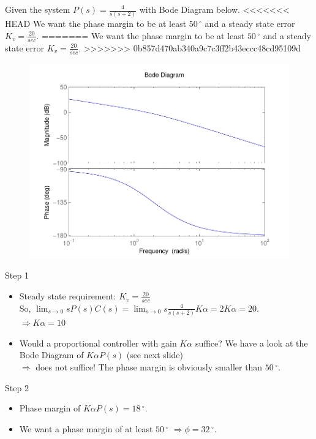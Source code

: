 \begin{frame}
\begin{example}
	Given the system $P(s) = \frac{4}{s(s+2)}$ with Bode Diagram below. 
	\vspace{0.1 cm}
<<<<<<< HEAD
	We want the phase margin to be at least $50\,^{\circ}$ and a steady state error $K_v = \frac{20}{sec}$.  
=======
	We want the phase margin to be at least $50\,^{\circ}$ and a steady state error $K_v = \frac{20}{sec}$.
>>>>>>> 0b857d470ab340a9c7c3ff2b43eccc48cd95109d
	\begin{figure}
		\centering
		\includegraphics[width=0.5
		\linewidth]{bodeexamplelead}
	\end{figure}
\end{example}
\end{frame}

\begin{frame}
\begin{exampleblock}{Step 1}
\begin{itemize}	
\item Steady state requirement: $K_v = \frac{20}{sec}$ \\
So, $\lim_{s \to 0} sP(s)C(s) = \lim_{s \to 0} s\frac{4}{s(s+2)}K\alpha = 2K\alpha = 20$. \\
$\Rightarrow K\alpha = 10$
\item Would a proportional controller with gain $K\alpha$ suffice? We have a look at the Bode Diagram of $K\alpha P(s)$ (see next slide) \\
$\Rightarrow$ does not suffice! The phase margin is obviously smaller than $50\,^{\circ}$.
\end{itemize}
\end{exampleblock}
\begin{exampleblock}{Step 2}
	\begin{itemize}
	\item Phase margin of $K\alpha P(s) = 18\,^{\circ}$.
	\item We want a phase margin of at least $50\,^{\circ}$
	$\Rightarrow \phi = 32\,^{\circ}$.
	\end{itemize}
\end{exampleblock}
\end{frame}

